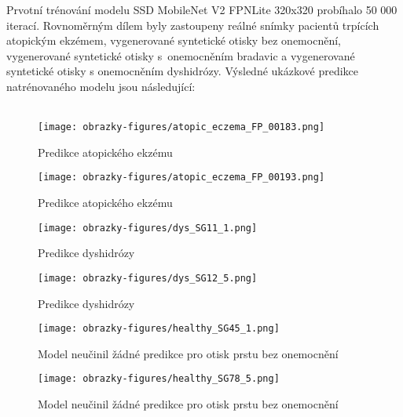 Prvotní trénování modelu SSD MobileNet V2 FPNLite 320x320 probíhalo 50 000 iterací. Rovnoměrným dílem byly zastoupeny reálné snímky pacientů trpících atopickým ekzémem, vygenerované syntetické otisky bez onemocnění, vygenerované syntetické otisky s~onemocněním bradavic a vygenerované syntetické otisky s onemocněním dyshidrózy. Výsledné ukázkové predikce natrénovaného modelu jsou následující:\\\\

\begin{figure}[!htbp]
  \begin{minipage}[b]{0.5\linewidth}
    \centering
    \texttt{[image: obrazky-figures/atopic\_eczema\_FP\_00183.png]}
    \caption{Predikce atopického ekzému}
    \label{fig:predikce}
  \end{minipage}
  \hspace{0.5cm}
  \begin{minipage}[b]{0.5\linewidth}
    \centering
    \texttt{[image: obrazky-figures/atopic\_eczema\_FP\_00193.png]}
    \caption{Predikce atopického ekzému}
  \end{minipage}
\end{figure}

\begin{figure}[!htbp]
  \begin{minipage}[b]{0.5\linewidth}
    \centering
    \texttt{[image: obrazky-figures/dys\_SG11\_1.png]}
    \caption{Predikce dyshidrózy}
  \end{minipage}
  \hspace{0.5cm}
  \begin{minipage}[b]{0.5\linewidth}
    \centering
    \texttt{[image: obrazky-figures/dys\_SG12\_5.png]}
    \caption{Predikce dyshidrózy}
  \end{minipage}
\end{figure}

\begin{figure}[!htbp]
  \begin{minipage}[b]{0.5\linewidth}
    \centering
    \texttt{[image: obrazky-figures/healthy\_SG45\_1.png]}
    \caption{Model neučinil žádné predikce pro otisk prstu bez onemocnění}
  \end{minipage}
  \hspace{0.5cm}
  \begin{minipage}[b]{0.5\linewidth}
    \centering
    \texttt{[image: obrazky-figures/healthy\_SG78\_5.png]}
    \caption{Model neučinil žádné predikce pro otisk prstu bez onemocnění}
  \end{minipage}
\end{figure}

